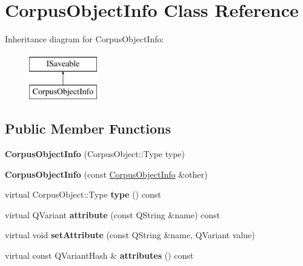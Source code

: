 \hypertarget{class_corpus_object_info}{}\section{Corpus\+Object\+Info Class Reference}
\label{class_corpus_object_info}
Inheritance diagram for Corpus\+Object\+Info\+:\begin{figure}[H]
\begin{center}
\leavevmode
\includegraphics[height=2.000000cm]{class_corpus_object_info}
\end{center}
\end{figure}
\subsection*{Public Member Functions}
\begin{DoxyCompactItemize}
\item 
\mbox{\label{class_corpus_object_info_a26f537cc34689b8ce4df14d57f0f81ba}} 
{\bfseries Corpus\+Object\+Info} (Corpus\+Object\+::\+Type type)
\item 
\mbox{\label{class_corpus_object_info_a5089ee69b35f30f00e103a487b0e970a}} 
{\bfseries Corpus\+Object\+Info} (const \hyperlink{class_corpus_object_info}{Corpus\+Object\+Info} \&other)
\item 
\mbox{\label{class_corpus_object_info_a451c0f8f88ee80a05abf7017cb6f2774}} 
virtual Corpus\+Object\+::\+Type {\bfseries type} () const
\item 
\mbox{\label{class_corpus_object_info_a273f644617e5df7213cad16c4849f564}} 
virtual Q\+Variant {\bfseries attribute} (const Q\+String \&name) const
\item 
\mbox{\label{class_corpus_object_info_ad808b5e30083c42413c5c524fea19c23}} 
virtual void {\bfseries set\+Attribute} (const Q\+String \&name, Q\+Variant value)
\item 
\mbox{\label{class_corpus_object_info_a2c4b752739540a1105fe1e89bc57f01e}} 
virtual const Q\+Variant\+Hash \& {\bfseries attributes} () const
\end{DoxyCompactItemize}
